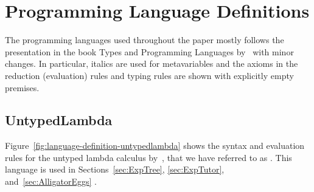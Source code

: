 \section{Programming Language Definitions}
\label{chr:appendix-programming-language-definitions}

The programming languages used throughout the paper
mostly follows
the presentation in
the book
Types and Programming Languages by~\citet{pierceTypesProgrammingLanguages2002}
with minor changes.
In particular,
italics are used for metavariables and
the axioms
in the reduction (evaluation) rules and
typing rules
are shown with explicitly empty premises.


\subsection{UntypedLambda}
\label{sec:language-definition-untypedlambda}

Figure~\ref{fig:language-definition-untypedlambda}
shows the syntax and evaluation rules
for the untyped lambda calculus by~\citet{churchUnsolvableProblemElementary1936a,churchCalculiLambdaconversion1941},
that we have referred to as .
%
This language is used in
Sections~\ref{sec:ExpTree},
\ref{sec:ExpTutor},
and~\ref{sec:AlligatorEggs}
.
%


